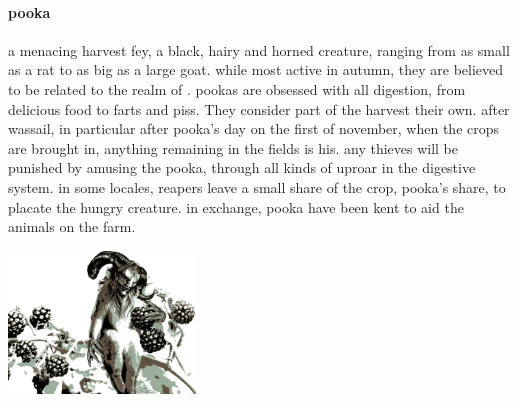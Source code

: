 \paragraph{pooka} a menacing harvest fey, a black, hairy and horned creature, ranging from as small as a rat to as big as a large goat. while most active in autumn, they are believed to be related to the realm of . pookas are obsessed with all digestion, from delicious food to farts and piss. They consider part of the harvest their own. after wassail, in particular after pooka's day on the first of november, when the crops are brought in, anything remaining in the fields is his. any thieves will be punished by amusing the pooka, through all kinds of uproar in the digestive system. in some locales, reapers leave a small share of the crop, pooka's share, to placate the hungry creature. in exchange, pooka have been kent to aid the animals on the farm. \begin{center}\includegraphics[width=5cm]{encyclopedia/pooka.png}\end{center}
